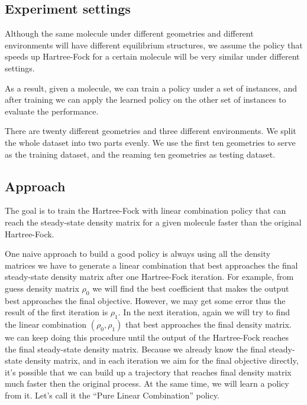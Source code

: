 \documentclass[twoside]{article}
\begin{document}
\subsection{Experiment settings}


Although the same molecule under different geometries and different environments will have different equilibrium structures, we assume the policy that speeds up Hartree-Fock for a certain molecule will be very similar under different settings. 

As a result, given a molecule, we can train a policy under a set of instances, and after training we can apply the learned policy on the other set of instances to evaluate the performance.

There are twenty different geometries and three different environments. We split the whole dataset into two parts evenly. 
We use the first ten geometries to serve as the training dataset, and the reaming ten geometries as testing dataset.

\subsection{Approach}
The goal is to train the Hartree-Fock with linear combination policy that can reach the steady-state density matrix for a given molecule faster than the original Hartree-Fock.


One naive approach to build a good policy is always using all the density matrices we have to generate a linear combination that best approaches the final steady-state density matrix after one Hartree-Fock iteration.  For example, from guess density matrix $\rho_0$ we will find the best coefficient that makes the output best approaches the final objective. However, we may get some error thus the result of the first iteration is $\rho_1$.  In the next iteration, again we will try to find the linear combination $(\rho_0, \rho_1)$ that best approaches the final density matrix. we can keep doing this procedure until the output of the Hartree-Fock reaches the final steady-state density matrix.
Because we already know the final steady-state density matrix, and in each iteration we aim for the final objective directly, it's possible that we can build up a trajectory that reaches final density matrix much faster then the original process. At the same time, we will learn a policy from it. Let's call it the ``Pure Linear Combination'' policy.
\end{document}
